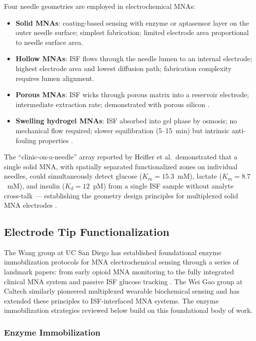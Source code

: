 \documentclass[review,1p]{elsarticle}
\begin{document}
Four needle geometries are employed in electrochemical MNAs:
\begin{itemize}
    \item \textbf{Solid MNAs}: coating-based sensing with enzyme or aptasensor layer on the outer needle surface; simplest fabrication; limited electrode area proportional to needle surface area.
    \item \textbf{Hollow MNAs}: ISF flows through the needle lumen to an internal electrode; highest electrode area and lowest diffusion path; fabrication complexity requires lumen alignment.
    \item \textbf{Porous MNAs}: ISF wicks through porous matrix into a reservoir electrode; intermediate extraction rate; demonstrated with porous silicon \cite{Ning2021Porous}.
    \item \textbf{Swelling hydrogel MNAs}: ISF absorbed into gel phase by osmosis; no mechanical flow required; slower equilibration (5--15~min) but intrinsic anti-fouling properties \cite{Zhou2024}.
\end{itemize}

The ``clinic-on-a-needle'' array reported by Heifler et al.\ demonstrated that a single solid MNA, with spatially separated functionalized zones on individual needles, could simultaneously detect glucose ($K_m = 15.3$~mM), lactate ($K_m = 8.7$~mM), and insulin ($K_d = 12$~pM) from a single ISF sample without analyte cross-talk — establishing the geometry design principles for multiplexed solid MNA electrodes \cite{Heifler2021}.

\subsection{Electrode Tip Functionalization}
\label{subsec:functionalization}

The Wang group at UC San Diego has established foundational enzyme immobilization protocols for MNA electrochemical sensing through a series of landmark papers: from early opioid MNA monitoring \cite{Mishra2021MNA} to the fully integrated clinical MNA system \cite{Tehrani2022NatBiomedEng} and passive ISF glucose tracking \cite{Barfidokht2022Wang}. The Wei Gao group at Caltech similarly pioneered multiplexed wearable biochemical sensing \cite{Gao2016Multiplexed} and has extended these principles to ISF-interfaced MNA systems. The enzyme immobilization strategies reviewed below build on this foundational body of work.

\subsubsection{Enzyme Immobilization}
\end{document}
